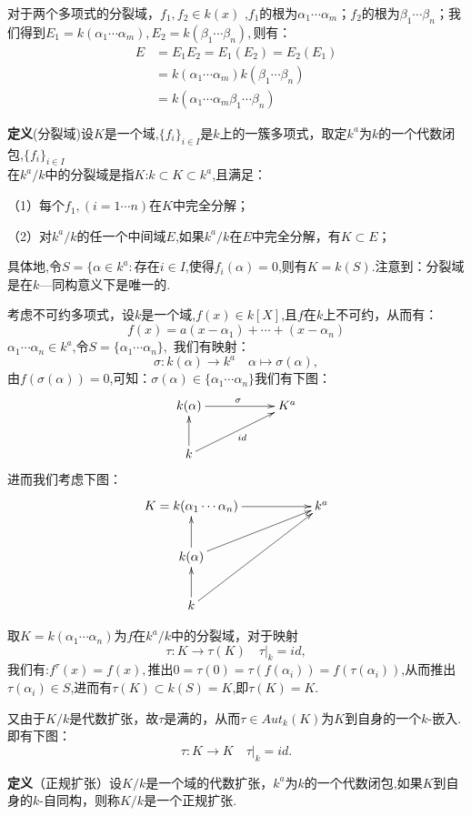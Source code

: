 \documentclass[UTF8]{article}
\begin{document}
对于两个多项式的分裂域，$f_1,f_2\in k(x)$ ,$f_1$的根为$\alpha_1 \cdots \alpha_m$；$f_2$的根为$\beta_1 \cdots \beta_n$；我们得到$E_1=k(\alpha_1 \cdots \alpha_m),E_2=k(\beta_1 \cdots \beta_n),$则有：
\[
\begin{split}
E&=E_1E_2=E_1(E_2)=E_2(E_1)\\
&=k(\alpha_1 \cdots \alpha_m)k(\beta_1 \cdots \beta_n)\\
&=k(\alpha_1 \cdots \alpha_m \beta_1 \cdots \beta_n)
\end{split}
\]

\textbf{定义}(分裂域)\quad 设$K$是一个域,$\{f_i\}_{i\in I}$是$k$上的一簇多项式，取定$k^a$为$k$的一个代数闭包,$\{f_i\}_{i\in I}$\\在$k^a/k$中的分裂域是指$K$:$k\subset K\subset k^a$,且满足：

（1）每个$f_1,(i=1\cdots n)$在$K$中完全分解；

（2）对$k^a/k$的任一个中间域$E$,如果$k^a/k$在$E$中完全分解，有$K\subset E$；

具体地,令$S=\{\alpha\in k^a:$存在$i\in I$,使得$f_i(\alpha)=0$,则有$K=k(S).$注意到：分裂域是在$k$—同构意义下是唯一的.

考虑不可约多项式，设$k$是一个域,$f(x)\in k[X]$,且$f$在$k$上不可约，从而有：
$$f(x)=a(x-\alpha_1)+\cdots+(x-\alpha_n)$$
$\alpha_1 \cdots \alpha_n\in k^a$,令$S=\{\alpha_1 \cdots \alpha_n\},$
我们有映射：$$\sigma:k(\alpha)\rightarrow k^a \quad \alpha\longmapsto\sigma(\alpha), $$
由$f(\sigma(\alpha))=0 $,可知：$\sigma(\alpha)\in \{\alpha_1 \cdots \alpha_n\}$我们有下图：$$\xymatrix{k(\alpha)\ar[rr]^{\sigma}&&K^{a}\\k\ar[u] \ar[rru]_{id}&}$$进而我们考虑下图：$$\xymatrix{K=k(\alpha_1 \cdots \alpha_n)\ar[rr]&&{k^a}\\k(\alpha) \ar[u] \ar[rru] && \\k \ar[u] \ar[rruu] &&}$$

取$K=k(\alpha_1 \cdots \alpha_n)$为$f$在$k^a/k$中的分裂域，对于映射$$\tau:K\rightarrow \tau(K) \quad \tau|_k=id,$$我们有:$f^{\tau}(x)=f(x),$推出$0=\tau(0)=\tau(f(\alpha_i))=f(\tau(\alpha_i))$,从而推出$\tau(\alpha_i)\in S$,进而有$\tau (K)\subset k(S)=K$,即$\tau (K)=K.$

又由于$K/k$是代数扩张，故$\tau$是满的，从而$\tau\in Aut_k(K)$为$K$到自身的一个$k$-嵌入.
即有下图：$$\tau:K\rightarrow K \quad\tau|_k=id.$$ 

\textbf{定义}（正规扩张）\quad 设$K/k$是一个域的代数扩张，$k^a$为$k$的一个代数闭包,如果$K$到自身的$k$-自同构，则称$K/k$是一个正规扩张.
\end{document}
